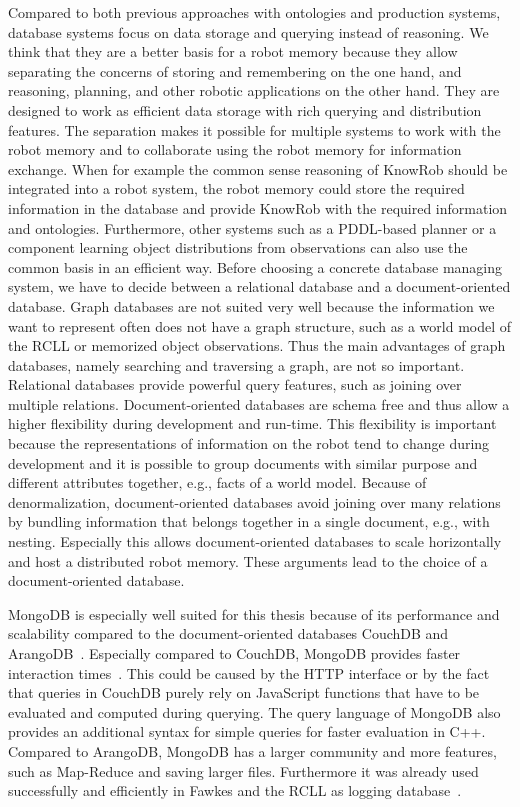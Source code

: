 Compared to both previous approaches with ontologies and production
systems, database systems focus on data storage and querying instead
of reasoning. We think that they are a better basis for a robot memory
because they allow separating the concerns of storing and remembering
on the one hand, and reasoning, planning, and other robotic
applications on the other hand. They are designed to work as efficient
data storage with rich querying and distribution features. The
separation makes it possible for multiple systems to work with the
robot memory and to collaborate using the robot memory for information
exchange. When for example the common
sense reasoning of KnowRob should be integrated into a robot system,
the robot memory could store the required information in the database
and provide KnowRob with the required information and
ontologies. Furthermore, other systems such as a PDDL-based planner or a
component learning object distributions from observations can also use the
common basis in an efficient way. Before choosing a concrete database
managing system, we have to decide between a relational database and a
document-oriented database. Graph databases are not suited very well
because the information we want to represent often does not have a
graph structure, such as a world model of the RCLL or memorized object
observations. Thus the main advantages of graph databases, namely searching
and traversing a graph, are not so important. Relational databases provide powerful query features,
such as joining over multiple relations. Document-oriented databases
are schema free and thus allow a higher flexibility during development
and run-time. This flexibility is important because the representations of
information on the robot tend to change during development and it is
possible to group documents with similar purpose and different
attributes together, e.g., facts of a world model. Because of
denormalization, document-oriented databases avoid
joining over many relations by bundling information that
belongs together in a single document, e.g., with nesting. Especially this
allows document-oriented databases to scale horizontally and host a
distributed robot memory. These arguments lead to
the choice of a document-oriented database.

MongoDB is especially well suited for this thesis because of its
performance and scalability compared to the document-oriented
databases CouchDB and
ArangoDB~\cite{arango-vs-mongo}. Especially compared to
CouchDB, MongoDB provides faster interaction times~\cite{db-comparison}. This could be
caused by the HTTP interface or by the fact that queries in CouchDB purely rely on JavaScript
functions that have to be evaluated and computed during querying. The
query language of MongoDB also provides an additional syntax for
simple queries for faster evaluation in C++. Compared to ArangoDB,
MongoDB has a larger community and more features, such as Map-Reduce
and saving larger files. Furthermore it was already used successfully
and efficiently in Fawkes and the RCLL as logging
database~\cite{RoboDB,RCLL2015Eval}.

